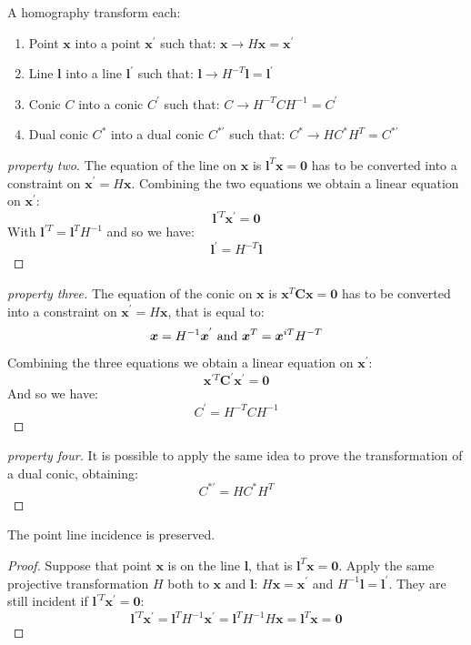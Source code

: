 \documentclass[12pt, a4paper]{report}
\begin{document}
    \begin{definition}
        A homography transform each: 
        \begin{enumerate}
            \item Point $\boldsymbol{x}$ into a point $\boldsymbol{x}^{'}$ such that: $\boldsymbol{x} \rightarrow H \boldsymbol{x}=\boldsymbol{x}^{'}$
            \item Line $\boldsymbol{l}$ into a line $\boldsymbol{l}^{'}$ such that: $\boldsymbol{l} \rightarrow H^{-T} \boldsymbol{l}=\boldsymbol{l}^{'}$
            \item Conic $C$ into a conic $C^{'}$ such that: $C \rightarrow H^{-T} CH^{-1}=C^{'}$
            \item Dual conic $C^{*}$ into a dual conic $C^{*'}$ such that: $C^{*} \rightarrow H C^{*}H^{T}=C^{*'}$
        \end{enumerate}
    \end{definition}
    \begin{proof}[property two]
        The equation of the line on $\boldsymbol{x}$ is $\boldsymbol{l}^T\boldsymbol{x}=\boldsymbol{0}$ has to be converted into a constraint on $\boldsymbol{x}^{'} = H \boldsymbol{x}$. Combining the two 
        equations we obtain a linear equation on $\boldsymbol{x}^{'}$: 
        \[\boldsymbol{l}^{'T}\boldsymbol{x}^{'}=\boldsymbol{0}\]
        With $\boldsymbol{l}^{'T}=\boldsymbol{l}^{T}H^{-1}$ and so we have: 
        \[\boldsymbol{l}^{'}=H^{-T}\boldsymbol{l}\]
    \end{proof}
    \begin{proof}[property three]
        The equation of the conic on $\boldsymbol{x}$ is $\boldsymbol{x}^{T}\boldsymbol{C}\boldsymbol{x}=\boldsymbol{0}$ has to be converted into a constraint on $\boldsymbol{x}^{'} = H \boldsymbol{x}$, that 
        is equal to:
        \[\boldsymbol{x}=H^{-1}\boldsymbol{x}^{'} \textnormal{ and } \boldsymbol{x}^{T}=\boldsymbol{x}^{iT}H^{-T}\]
        Combining the three equations we obtain a linear equation on $\boldsymbol{x}^{'}$: 
        \[\boldsymbol{x}^{'T}\boldsymbol{C}^{'}\boldsymbol{x}^{'}=\boldsymbol{0}\]
        And so we have: 
        \[C^{'}=H^{-T} CH^{-1}\]
    \end{proof}
    \begin{proof}[property four]
        It is possible to apply the same idea to prove the transformation of a dual conic, obtaining:
        \[C^{*'}=H C^{*}H^{T}\]
    \end{proof}
    The point line incidence is preserved. 
    \begin{proof}
        Suppose that point $\boldsymbol{x}$ is on the line $\boldsymbol{l}$, that is $\boldsymbol{l}^T\boldsymbol{x}=\boldsymbol{0}$. Apply the same projective transformation $H$ both to $\boldsymbol{x}$ 
        and $\boldsymbol{l}$: $H\boldsymbol{x}=\boldsymbol{x}^{'}$ and $H^{-1}\boldsymbol{l}=\boldsymbol{l}^{'}$. They are still incident if $\boldsymbol{l}^{'T}\boldsymbol{x}^{'}=\boldsymbol{0}$:
        \[\boldsymbol{l}^{'T}\boldsymbol{x}^{'}=\boldsymbol{l}^{T}H^{-1}\boldsymbol{x}^{'}=\boldsymbol{l}^{T}H^{-1}H\boldsymbol{x}=\boldsymbol{l}^{T}\boldsymbol{x}=\boldsymbol{0}\]
    \end{proof}
\end{document}
